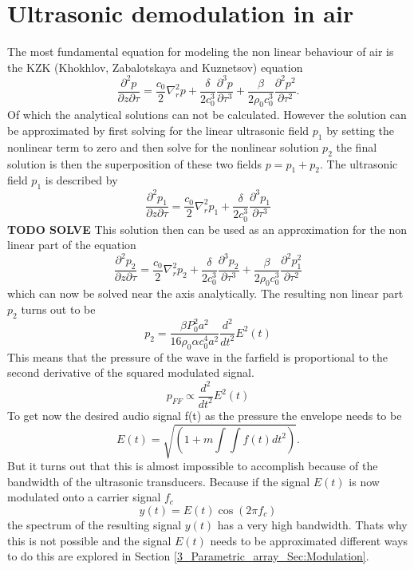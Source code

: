 \section{Ultrasonic demodulation in air}\label{3_sec:demodulation}
The most fundamental equation for modeling the non linear behaviour of air is the KZK (Khokhlov, Zabalotskaya and Kuznetsov) equation \cite{MIT_Ultrasound}
\begin{equation}
    \frac{\partial^2 p}{\partial z \partial \tau} 
    = 
    \frac{c_0}{2} \nabla^2_rp
    + 
    \frac{\delta}{2c_0^3}\frac{\partial^3 p}{\partial \tau^3} 
    + 
    \frac{\beta}{2\rho_0c_0^3}\frac{\partial^2 p^2}{\partial \tau^2}.
\end{equation}
Of which the analytical solutions can not be calculated.
However the solution can be approximated by first solving for the linear ultrasonic field $p_1$ by setting the nonlinear term to zero and then solve for the nonlinear solution $p_2$ the final solution is then the superposition of these two fields $p = p_1 + p_2$.
The ultrasonic field $p_1$ is described by 
\begin{equation}
     \frac{\partial^2 p_1}{\partial z \partial \tau} 
    = 
    \frac{c_0}{2} \nabla^2_rp_1 
    + 
    \frac{\delta}{2c_0^3}\frac{\partial^3 p_1}{\partial \tau^3} 
\end{equation}
\textbf{TODO SOLVE}
This solution then can be used as an approximation for the non linear part of the equation
\begin{equation}
     \frac{\partial^2 p_2}{\partial z \partial \tau} 
    = 
    \frac{c_0}{2} \nabla^2_rp_2 
    + 
    \frac{\delta}{2c_0^3}\frac{\partial^3 p_2}{\partial \tau^3} 
    + 
    \frac{\beta}{2\rho_0c_0^3}\frac{\partial^2 p_1^2}{\partial \tau^2}
\end{equation}
which can now be solved near the axis analytically.
The resulting non linear part $p_2$ turns out to be 
\begin{equation}
    p_2 = \frac{\beta P_0^2 a^2}{16 \rho_0 \alpha c_0^4 a^2}\frac{d^2}{dt^2} E^2(t)
\end{equation}
This means that the  pressure of the wave in the farfield is proportional to the second derivative of the squared modulated signal.
\begin{equation}
    p_{FF} \propto \frac{d^2}{dt^2} E^2(t)
\end{equation}
To get now the desired audio signal f(t) as the pressure the envelope needs to be
\begin{equation}
    E(t) = \sqrt{\left ( 1 + m \int \int f(t)dt^2 \right )}.
\end{equation}
But it turns out that this is almost impossible to accomplish because of the bandwidth of the ultrasonic transducers.
Because if the signal $E(t)$ is now modulated onto a carrier signal $f_c$  
\begin{equation}\label{3_Parametric_array_eq:Modulated_Envelope}
    y(t) = E(t) \cos{\left ( 2 \pi f_c \right )}
\end{equation}
the spectrum of the resulting signal $y(t)$ has a very high bandwidth.
Thats why this is not possible and the signal $E(t)$ needs to be approximated different ways to do this are explored in Section \ref{3_Parametric_array_Sec:Modulation}.

